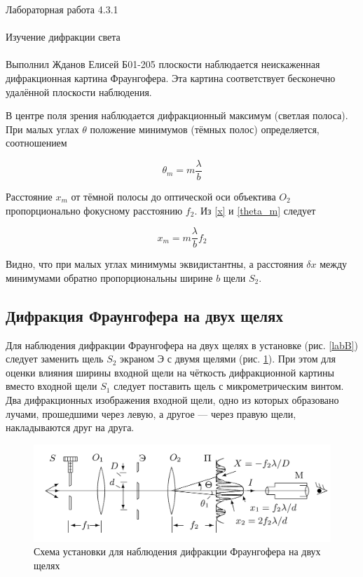 \documentclass{astroedu-lab}
\begin{document}
\begin{problem}{\huge Лабораторная работа 4.3.1\\\\Изучение дифракции света\\\\Выполнил Жданов Елисей Б01-205}
плоскости наблюдается неискаженная дифракционная картина Фраунгофера. Эта картина соответствует бесконечно удалённой плоскости
наблюдения.

В центре поля зрения наблюдается дифракционный максимум (светлая полоса). При малых углах $ \theta $ положение минимумов (тёмных полос)
определяется, соотношением

\begin{equation}\label{theta_m}
\theta_m = m \dfrac{\lambda}{b}
\end{equation}

Расстояние $ x_m $ от тёмной полосы до оптической оси объектива $ O_2 $ пропорционально фокусному расстоянию $ f_2 $. Из \eqref{x} и \eqref{theta_m} следует 

\begin{equation}\label{xm}
x_m = m \dfrac{\lambda}{b} f_2
\end{equation}

Видно, что при малых углах минимумы эквидистантны, а расстояния $ \delta x $ между минимумами обратно пропорциональны ширине $ b $ щели $ S_2 $.



\subsection{Дифракция Фраунгофера на двух щелях}

Для наблюдения дифракции Фраунгофера на двух щелях в установке (рис. \ref{labB}) следует заменить щель $ S_2 $ экраном Э с двумя щелями
(рис. \ref{labC}). При этом для оценки влияния ширины входной щели на чёткость дифракционной картины вместо входной щели $ S_1 $ следует поставить щель с микрометрическим винтом. Два дифракционных изображения входной щели, одно из которых образовано лучами, прошедшими через левую, а другое --- через правую щели, накладываются друг на друга.

\begin{figure}[H]
	\centering
	\includegraphics[scale=0.15]{4.3.1/clab.jpeg}
	\caption{Схема установки для наблюдения дифракции Фраунгофера на двух щелях}
	\label{labC}
\end{figure}


\end{problem}
\end{document}
